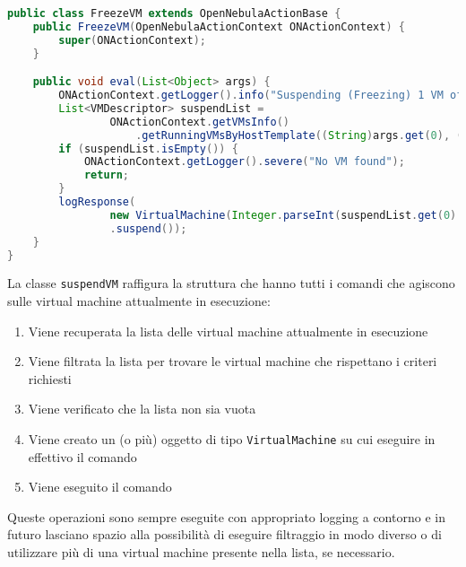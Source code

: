 \begin{lstlisting}[language=Java, caption=Classe per freezzare(sospendere) una \texttt{VirtualMachine}, label=code:FreezeVM, basicstyle=\fontsize{8.5}{9.5}\ttfamily]
public class FreezeVM extends OpenNebulaActionBase {
    public FreezeVM(OpenNebulaActionContext ONActionContext) {
        super(ONActionContext);
    }

    public void eval(List<Object> args) {
        ONActionContext.getLogger().info("Suspending (Freezing) 1 VM of [host, template]: " + "[" + args.get(0) + " " + args.get(2) + "]");
        List<VMDescriptor> suspendList = 
                ONActionContext.getVMsInfo()
                    .getRunningVMsByHostTemplate((String)args.get(0), (String)args.get(2));
        if (suspendList.isEmpty()) {
            ONActionContext.getLogger().severe("No VM found");
            return;
        }
        logResponse(
                new VirtualMachine(Integer.parseInt(suspendList.get(0).getVmId()), ONActionContext.getClient())
                .suspend());
    }
}
\end{lstlisting}
La classe \texttt{suspendVM} raffigura la struttura che hanno tutti i comandi che agiscono sulle virtual machine attualmente in esecuzione:
\begin{enumerate}
    \item Viene recuperata la lista delle virtual machine attualmente in esecuzione
    \item Viene filtrata la lista per trovare le virtual machine che rispettano i criteri richiesti
    \item Viene verificato che la lista non sia vuota
    \item Viene creato un (o più) oggetto di tipo \texttt{VirtualMachine} su cui eseguire in effettivo il comando
    \item Viene eseguito il comando
\end{enumerate}
Queste operazioni sono sempre eseguite con appropriato logging a contorno e in futuro lasciano spazio alla possibilità di eseguire filtraggio in modo diverso o di utilizzare più di una virtual machine presente nella lista, se necessario.

